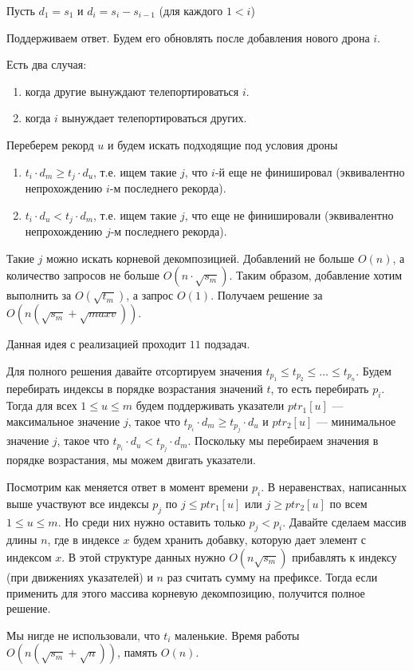 Пусть $d_1 = s_1$ и $d_i = s_i-s_{i-1}$ (для каждого $1<i$)

Поддерживаем ответ. Будем его обновлять после добавления нового дрона $i$.

Есть два случая:

\begin{enumerate}
\item когда другие вынуждают телепортироваться $i$.
\item когда $i$ вынуждает телепортироваться других.
\end{enumerate}

Переберем рекорд $u$ и будем искать подходящие под условия дроны

\begin{enumerate}
\item $t_i\cdot d_m \geq t_j\cdot d_u$, т.е. ищем такие $j$, что $i$-й еще не финишировал (эквивалентно непрохождению $i$-м последнего рекорда).
\item $t_i\cdot d_u < t_j\cdot d_m$, т.е. ищем такие $j$, что еще не финишировали (эквивалентно непрохождению $j$-м последнего рекорда).
\end{enumerate}

Такие $j$ можно искать корневой декомпозицией. Добавлений не больше $O(n)$, а количество запросов не больше $O(n\cdot \sqrt{s_m})$. Таким образом, добавление хотим выполнить за $O(\sqrt{t_m})$, а запрос $O(1)$. Получаем решение за $O(n (\sqrt{s_m} + \sqrt{maxv}))$.

Данная идея с реализацией проходит $11$ подзадач. 

Для полного решения давайте отсортируем значения $t_{p_1} \leq t_{p_2} \leq \ldots \leq t_{p_n}$. Будем перебирать индексы в порядке возрастания значений $t$, то есть перебирать $p_i$. Тогда для всех $1 \leq u \leq m$ будем поддерживать указатели $ptr_1[u]$ --- максимальное значение $j$, такое что $t_{p_i}\cdot d_m \geq t_{p_j}\cdot d_u$ и $ptr_2[u]$ --- минимальное значение $j$, такое что $t_{p_i}\cdot d_u < t_{p_j}\cdot d_m$. Поскольку мы перебираем значения в порядке возрастания, мы можем двигать указатели.

Посмотрим как меняется ответ в момент времени $p_i$. В неравенствах, написанных выше участвуют все индексы $p_j$ по $j \leq ptr_1[u]$ или $j \geq ptr_2[u]$ по всем $1 \leq u \leq m$. Но среди них нужно оставить только $p_j < p_i$. Давайте сделаем массив длины $n$, где в индексе $x$ будем хранить добавку, которую дает элемент с индексом $x$. В этой структуре данных нужно $O(n \sqrt{s_m})$ прибавлять к индексу (при движениях указателей) и $n$ раз считать сумму на префиксе. Тогда если применить для этого массива корневую декомпозицию, получится полное решение.

Мы нигде не использовали, что $t_i$ маленькие. Время работы $O(n (\sqrt{s_m} + \sqrt{n}))$, память $O(n)$.
